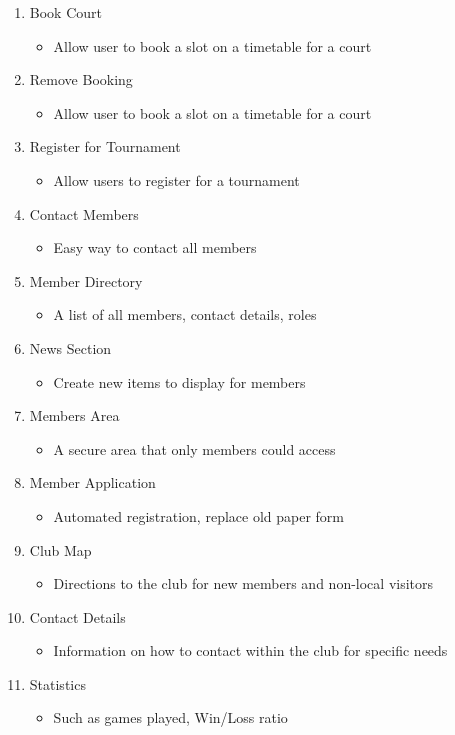 \begin{table}[H]
\begin{enumerate}
\item Book Court
\begin{itemize}
\item Allow user to book a slot on a timetable for a court
\end{itemize}
\item Remove Booking
\begin{itemize}
\item Allow user to book a slot on a timetable for a court
\end{itemize}
\item Register for Tournament
\begin{itemize}
\item Allow users to register for a tournament
\end{itemize}
\item Contact Members
\begin{itemize}
\item Easy way to contact all members
\end{itemize}
\item Member Directory
\begin{itemize}
\item A list of all members, contact details, roles
\end{itemize}
\item News Section
\begin{itemize}
\item Create new items to display for members
\end{itemize}
\item Members Area
\begin{itemize}
\item A secure area that only members could access
\end{itemize}
\item Member Application
\begin{itemize}
\item Automated registration, replace old paper form
\end{itemize}
\item Club Map
\begin{itemize}
\item Directions to the club for new members and non-local visitors
\end{itemize}
\item Contact Details
\begin{itemize}
\item Information on how to contact within the club for specific needs
\end{itemize}
\item Statistics
\begin{itemize}
\item Such as games played, Win/Loss ratio
\end{itemize}


\end{enumerate}
\label{fig:secRoles}
\end{table}
